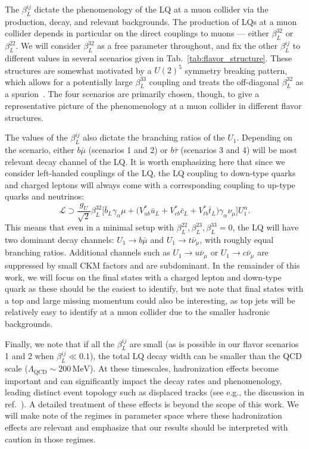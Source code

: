 \documentclass[a4paper,11pt]{article}
\begin{document}
The $\beta_L^{ij}$ dictate the phenomenology of the LQ at a muon collider via the production, decay, and relevant backgrounds.
The production of LQs at a muon collider depends in particular on the direct couplings to muons --- either $\beta_L^{32}$ or $\beta_L^{22}$.   
We will consider $\beta_L^{32}$ as a free parameter throughout, and fix the other $\beta_L^{ij}$ to different values in several scenarios given in Tab.~\ref{tab:flavor_structure}.
These structures are somewhat motivated by a $U(2)^5$ symmetry breaking pattern, which allows for a potentially large $\beta_L^{33}$ coupling and treats the off-diagonal $\beta_L^{32}$ as a spurion~\cite{Barbieri:2011ci}.
The four scenarios are primarily chosen, though, to give a representative picture of the phenomenology at a muon collider in different flavor structures. 



The values of the $\beta_L^{ij}$ also dictate the branching ratios of the $U_1$. Depending on the scenario, either $b\bar{\mu}$ (scenarios 1 and 2) or $b\bar{\tau}$ (scenarios 3 and 4) will be most relevant decay channel of the LQ.
It is worth emphasizing here that since we consider left-handed couplings of the LQ, the LQ coupling to down-type quarks and charged leptons will always come with a corresponding coupling to up-type quarks and neutrinos:
\begin{equation}
\mathcal{L}\supset \frac{g_U}{\sqrt{2}} \beta_L^{32} \big[ \bar{b}_L \gamma_{\alpha} \mu + \big( V^*_{ub} \bar{u}_L + V^*_{cb} \bar{c}_L +V^*_{tb} \bar{t}_L \big) \gamma_{\alpha} \nu_{\mu}
 \big]U_1^{\alpha} .
\label{eq:U1top}
\end{equation}
This means that even in a minimal setup with $\beta_L^{22},\beta_L^{23},\beta_L^{33}=0$, the LQ will have two dominant decay channels: $U_1\to b \bar{\mu}$ and $U_1 \to t \bar{\nu}_\mu$, with roughly equal branching ratios.
Additional channels such as $U_1 \to u \bar{\nu}_\mu$ or $U_1 \to c \bar{\nu}_\mu$ are suppressed by small CKM factors and are subdominant.
In the remainder of this work, we will focus on the final states with a charged lepton and down-type quark as these should be the easiest to identify, but we note that final states with a top and large missing momentum could also be interesting, as top jets will be relatively easy to identify at a muon collider due to the smaller hadronic backgrounds.

Finally, we note that if all the $\beta_L^{ij}$ are small (as is possible in our flavor scenarios 1 and 2 when $\beta_{L}^{ij} \ll 0.1$), the total LQ decay width can be smaller than the QCD scale ($\Lambda_{\textrm{QCD}} \sim 200\,\textrm{MeV}$).
At these timescales, hadronization effects become important and can significantly impact the decay rates and phenomenology, leading distinct event topology such as displaced tracks (see e.g., the discussion in ref.~\cite{Hiller:2018wbv}). A detailed treatment of these effects is beyond the scope of this work. We will make note of the regimes in parameter space where these hadronization effects are relevant and emphasize that our results should be interpreted with caution in those regimes.
\end{document}
